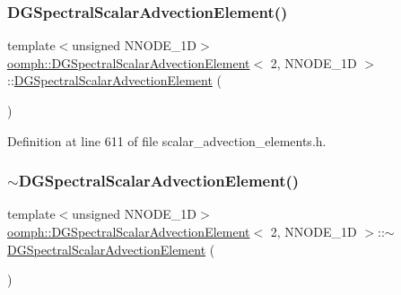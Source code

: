 \subsubsection{\texorpdfstring{D\+G\+Spectral\+Scalar\+Advection\+Element()}{DGSpectralScalarAdvectionElement()}}
{\footnotesize\ttfamily template$<$unsigned N\+N\+O\+D\+E\+\_\+1D$>$ \\
\hyperlink{classoomph_1_1DGSpectralScalarAdvectionElement}{oomph\+::\+D\+G\+Spectral\+Scalar\+Advection\+Element}$<$ 2, N\+N\+O\+D\+E\+\_\+1D $>$\+::\hyperlink{classoomph_1_1DGSpectralScalarAdvectionElement}{D\+G\+Spectral\+Scalar\+Advection\+Element} (\begin{DoxyParamCaption}{ }\end{DoxyParamCaption})\hspace{0.3cm}{\ttfamily [inline]}}



Definition at line 611 of file scalar\+\_\+advection\+\_\+elements.\+h.

\mbox{\label{classoomph_1_1DGSpectralScalarAdvectionElement_3_012_00_01NNODE__1D_01_4_aba398e8f3377f11b25957e4a86199c40}} 
\subsubsection{\texorpdfstring{$\sim$\+D\+G\+Spectral\+Scalar\+Advection\+Element()}{~DGSpectralScalarAdvectionElement()}}
{\footnotesize\ttfamily template$<$unsigned N\+N\+O\+D\+E\+\_\+1D$>$ \\
\hyperlink{classoomph_1_1DGSpectralScalarAdvectionElement}{oomph\+::\+D\+G\+Spectral\+Scalar\+Advection\+Element}$<$ 2, N\+N\+O\+D\+E\+\_\+1D $>$\+::$\sim$\hyperlink{classoomph_1_1DGSpectralScalarAdvectionElement}{D\+G\+Spectral\+Scalar\+Advection\+Element} (\begin{DoxyParamCaption}{ }\end{DoxyParamCaption})\hspace{0.3cm}{\ttfamily [inline]}}



